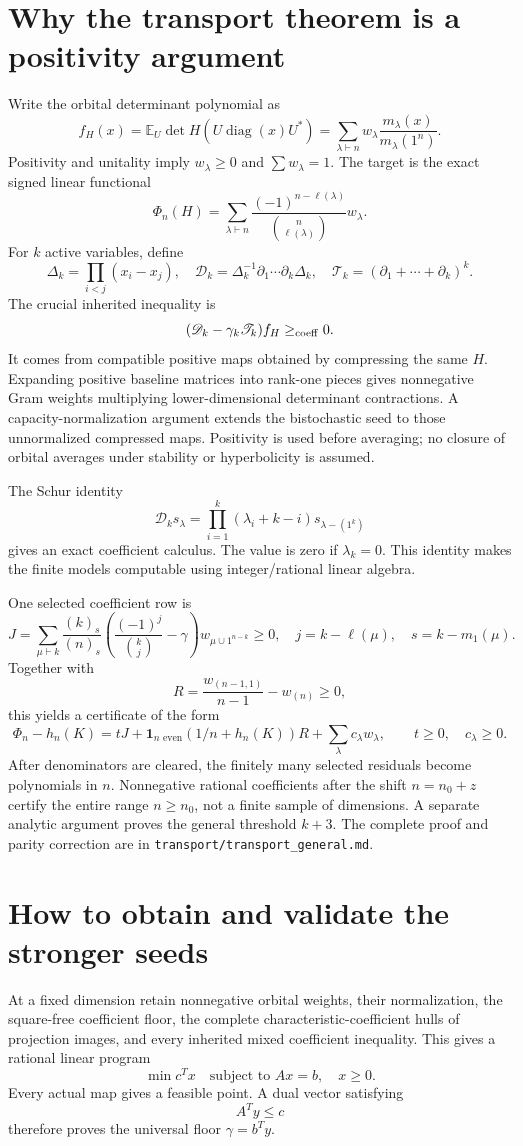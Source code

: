 \documentclass[11pt]{article}
\newcommand{\D}{\mathscr D}
\newcommand{\T}{\mathscr T}
\begin{document}
\section{Why the transport theorem is a positivity argument}
Write the orbital determinant polynomial as
\[
 f_H(x)=\mathbb E_U\det H(U\operatorname{diag}(x)U^*)
 =\sum_{\lambda\vdash n}w_\lambda
 \frac{m_\lambda(x)}{m_\lambda(1^n)}.
\]
Positivity and unitality imply $w_\lambda\ge0$ and $\sum w_\lambda=1$.
The target is the exact signed linear functional
\[
 \Phi_n(H)=\sum_{\lambda\vdash n}
 \frac{(-1)^{n-\ell(\lambda)}}{\binom n{\ell(\lambda)}}w_\lambda.
\]
For $k$ active variables, define
\[
 \Delta_k=\prod_{i<j}(x_i-x_j),\quad
 \D_k=\Delta_k^{-1}\partial_1\cdots\partial_k\Delta_k,
 \quad\T_k=(\partial_1+\cdots+\partial_k)^k.
\]
The crucial inherited inequality is
\[
 (\D_k-\gamma_k\T_k)f_H\ge_{\rm coeff}0.
\]
It comes from compatible positive maps obtained by compressing the same $H$.
Expanding positive baseline matrices into rank-one pieces gives nonnegative
Gram weights multiplying lower-dimensional determinant contractions. A
capacity-normalization argument extends the bistochastic seed to those
unnormalized compressed maps. Positivity is used before averaging; no closure
of orbital averages under stability or hyperbolicity is assumed.

The Schur identity
\[
 \D_ks_\lambda=
 \prod_{i=1}^k(\lambda_i+k-i)s_{\lambda-(1^k)}
\]
gives an exact coefficient calculus. The value is zero if $\lambda_k=0$.
This identity makes the finite models computable using integer/rational
linear algebra.

One selected coefficient row is
\[
 J=\sum_{\mu\vdash k}\frac{(k)_s}{(n)_s}
 \left(\frac{(-1)^j}{\binom kj}-\gamma\right)
 w_{\mu\cup1^{n-k}}\ge0,
 \quad j=k-\ell(\mu),\quad s=k-m_1(\mu).
\]
Together with
\[
 R=\frac{w_{(n-1,1)}}{n-1}-w_{(n)}\ge0,
\]
this yields a certificate of the form
\[
 \Phi_n-h_n(K)=tJ+\mathbf{1}_{n\text{ even}}(1/n+h_n(K))R
 +\sum_\lambda c_\lambda w_\lambda,
 \qquad t\ge0,\quad c_\lambda\ge0.
\]
After denominators are cleared, the finitely many selected residuals become
polynomials in $n$. Nonnegative rational coefficients after the shift
$n=n_0+z$ certify the entire range $n\ge n_0$, not a finite sample of
dimensions. A separate analytic argument proves the general threshold $k+3$.
The complete proof and parity correction are in
\texttt{transport/transport\_general.md}.

\section{How to obtain and validate the stronger seeds}
At a fixed dimension retain nonnegative orbital weights, their normalization,
the square-free coefficient floor, the complete characteristic-coefficient
hulls of projection images, and every inherited mixed coefficient inequality.
This gives a rational linear program
\[
 \min c^Tx\quad\text{subject to }Ax=b,\quad x\ge0.
\]
Every actual map gives a feasible point. A dual vector satisfying
\[
 A^Ty\le c
\]
therefore proves the universal floor $\gamma=b^Ty$.
\end{document}
